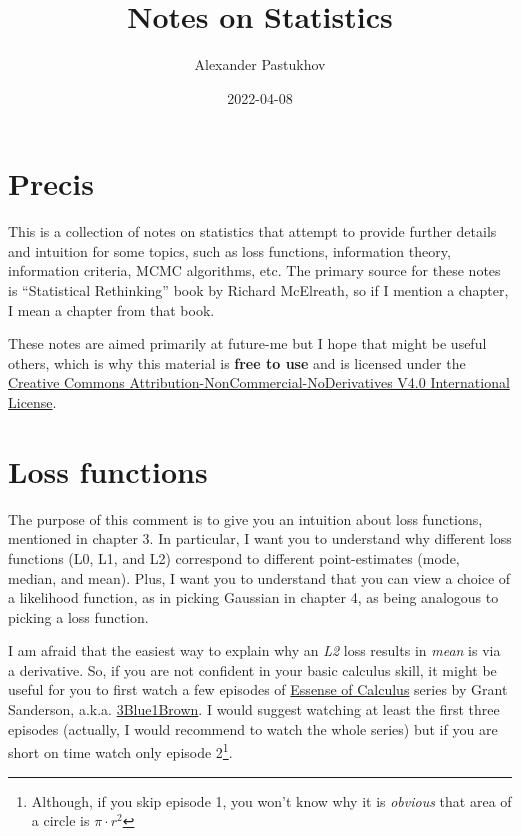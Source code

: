 \documentclass[
]{book}
\title{Notes on Statistics}
\author{Alexander Pastukhov}
\date{2022-04-08}
\begin{document}
\maketitle

{
\setcounter{tocdepth}{1}
\tableofcontents
}
\hypertarget{precis}{%
\chapter{Precis}\label{precis}}

This is a collection of notes on statistics that attempt to provide further details and intuition for some topics, such as loss functions, information theory, information criteria, MCMC algorithms, etc. The primary source for these notes is ``Statistical Rethinking'' book by Richard McElreath, so if I mention a chapter, I mean a chapter from that book.

These notes are aimed primarily at future-me but I hope that might be useful others, which is why this material is \textbf{free to use} and is licensed under the \href{https://creativecommons.org/licenses/by-nc-nd/4.0/}{Creative Commons Attribution-NonCommercial-NoDerivatives V4.0 International License}.

\hypertarget{loss-functions}{%
\chapter{Loss functions}\label{loss-functions}}

The purpose of this comment is to give you an intuition about loss functions, mentioned in chapter 3. In particular, I want you to understand why different loss functions (L0, L1, and L2) correspond to different point-estimates (mode, median, and mean). Plus, I want you to understand that you can view a choice of a likelihood function, as in picking Gaussian in chapter 4, as being analogous to picking a loss function.

I am afraid that the easiest way to explain why an \emph{L2} loss results in \emph{mean} is via a derivative. So, if you are not confident in your basic calculus skill, it might be useful for you to first watch a few episodes of \href{https://www.youtube.com/playlist?list=PLZHQObOWTQDMsr9K-rj53DwVRMYO3t5Yr}{Essense of Calculus} series by Grant Sanderson, a.k.a. \href{https://www.3blue1brown.com/}{3Blue1Brown}. I would suggest watching at least the first three episodes (actually, I would recommend to watch the whole series) but if you are short on time watch only episode 2\footnote{Although, if you skip episode 1, you won't know why it is \emph{obvious} that area of a circle is \(\pi\cdot r^2\)}.
\end{document}
